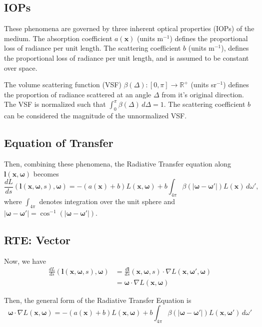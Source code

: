\documentclass[10pt]{article}
\newcommand\RR{\mathbb{R}}
\newcommand\abs[1]{\left| #1 \right|}
\renewcommand\vec{\mathbf}
\begin{document}
\subsection{IOPs}
These phenomena are governed by three inherent optical properties (IOPs) of the
medium.
The absorption coefficient $a(\vec{x})$ (units m$^{-1}$) defines the
proportional loss of radiance per unit length.
The scattering coefficient $b$ (units m$^{-1}$), defines the proportional loss
of radiance per unit length, and is assumed to be constant over space.

The volume scattering function (VSF) $\beta(\Delta): [0, \pi] \to \RR^+$ (units sr$^{-1}$) defines the
proportion of radiance scattered at an angle $\Delta$ from it's original
direction.
The VSF is normalized such that $\int_0^{\pi}\beta(\Delta)\,d\Delta = 1$.
The scattering coefficient $b$ can be considered the magnitude of the unnormalized VSF.

\subsection{Equation of Transfer}
Then, combining these phenomena, the Radiative Transfer equation along
$\vec{l}(\vec{x}, \vec{\omega})$ becomes
\begin{equation}
  \label{eqn:rte1d}
  \frac{dL}{ds}(\vec{l}(\vec{x}, \vec{\omega}, s), \vec{\omega})
  = -(a(\vec{x}) + b)L(\vec{x}, \vec{\omega})
  + b \int_{4\pi} \beta(|\vec{\omega} - \vec{\omega}'|) L(\vec{x})\, d\omega',
\end{equation}
where $\int_{4\pi}$ denotes integration over the unit sphere and
$|\vec{\omega}-\vec{\omega}'| = \cos^{-1}(\abs{\vec{\omega} - \vec{\omega}'})$.

\subsection{RTE: Vector}

Now, we have
\begin{align*}
  \frac{dL}{ds}(\vec{l}(\vec{x}, \vec{\omega}, s), \vec{\omega})
    &= \frac{d\vec{l}}{ds}(\vec{x}, \vec{\omega}, s) \cdot \nabla L(\vec{x, \vec{\omega}'}, \vec{\omega}) \\
    &= \vec{\omega} \cdot \nabla L(\vec{x}, \vec{\omega})
\end{align*}

Then, the general form of the Radiative Transfer Equation is
\begin{equation}
  \vec{\omega} \cdot \nabla L(\vec{x}, \vec{\omega})
  = -(a(\vec{x}) + b)L(\vec{x}, \vec{\omega})
  + b \int_{4\pi} \beta(|\vec{\omega} - \vec{\omega}'|) L(\vec{x}, \vec{\omega}')\, d\omega'
\end{equation}
\end{document}
